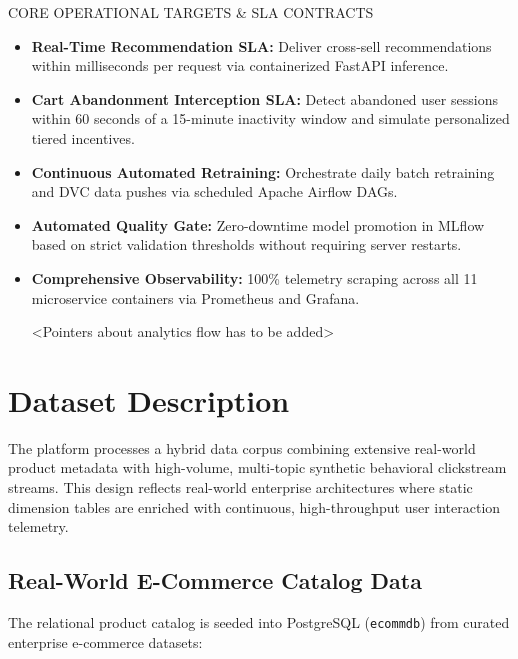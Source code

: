 \documentclass[11pt,a4paper]{article}
\begin{document}
\begin{calloutbox}{CORE OPERATIONAL TARGETS \& SLA CONTRACTS}
\begin{itemize}
    \item \textbf{Real-Time Recommendation SLA:} Deliver cross-sell recommendations within milliseconds per request via containerized FastAPI inference.
    \item \textbf{Cart Abandonment Interception SLA:} Detect abandoned user sessions within 60 seconds of a 15-minute inactivity window and simulate personalized tiered incentives.
    \item \textbf{Continuous Automated Retraining:} Orchestrate daily batch retraining and DVC data pushes via scheduled Apache Airflow DAGs.
    \item \textbf{Automated Quality Gate:} Zero-downtime model promotion in MLflow based on strict validation thresholds without requiring server restarts.
    \item \textbf{Comprehensive Observability:} 100\% telemetry scraping across all 11 microservice containers via Prometheus and Grafana.

    <Pointers about analytics flow has to be added>
\end{itemize}
\end{calloutbox}

\section{Dataset Description}

The platform processes a hybrid data corpus combining extensive real-world product metadata with high-volume, multi-topic synthetic behavioral clickstream streams. This design reflects real-world enterprise architectures where static dimension tables are enriched with continuous, high-throughput user interaction telemetry.

\subsection{Real-World E-Commerce Catalog Data}
The relational product catalog is seeded into PostgreSQL (\texttt{ecommdb}) from curated enterprise e-commerce datasets:
\end{document}
